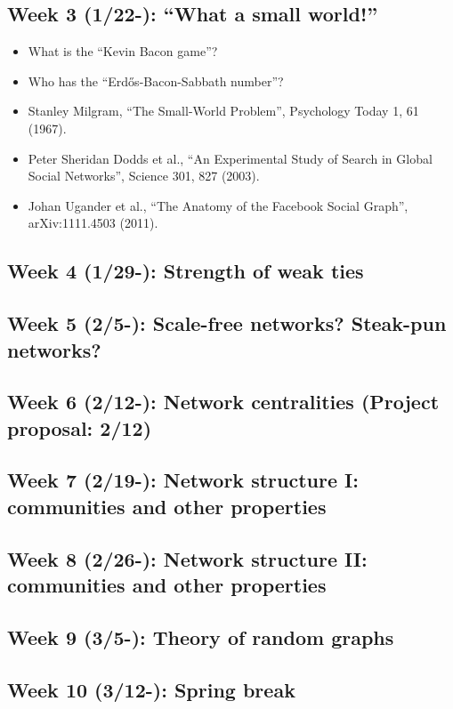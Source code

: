\documentclass[11pt,article,oneside]{memoir} %
\begin{document}
\subsection{Week 3 (1/22-):  ``What a small world!''}
\vspace{-0.2em}\begin{itemize}\itemsep0em
\item What is the ``Kevin Bacon game''?
\item Who has the ``Erdős-Bacon-Sabbath number''?
\item Stanley Milgram, ``The Small-World Problem'', Psychology Today 1, 61 (1967).
\item Peter Sheridan Dodds et al., ``An Experimental Study of Search in Global Social Networks'', Science 301, 827 (2003).
\item Johan Ugander et al., ``The Anatomy of the Facebook Social Graph'', arXiv:1111.4503 (2011).
\end{itemize}

\subsection{Week 4 (1/29-):  Strength of weak ties}
\subsection{Week 5 (2/5-):  Scale-free networks? Steak-pun networks?}
\subsection{Week 6 (2/12-):  Network centralities (Project proposal: 2/12)}
\subsection{Week 7 (2/19-):  Network structure I: communities and other properties}
\subsection{Week 8 (2/26-):  Network structure II: communities and other properties}
\subsection{Week 9 (3/5-):  Theory of random graphs}
\subsection{\color{gray}Week 10 (3/12-): Spring break}
\end{document}
